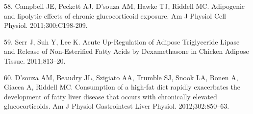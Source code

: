 \documentclass[11pt]{article} %
\begin{document}
58. Campbell JE, Peckett AJ, D'souza AM, Hawke TJ, Riddell MC.
Adipogenic and lipolytic effects of chronic glucocorticoid exposure. Am
J Physiol Cell Physiol. 2011;300:C198-209.

59. Serr J, Suh Y, Lee K. Acute Up-Regulation of Adipose Triglyceride
Lipase and Release of Non-Esterified Fatty Acids by Dexamethasone in
Chicken Adipose Tissue. 2011;813--20.

60. D'souza AM, Beaudry JL, Szigiato AA, Trumble SJ, Snook LA, Bonen A,
Giacca A, Riddell MC. Consumption of a high-fat diet rapidly exacerbates
the development of fatty liver disease that occurs with chronically
elevated glucocorticoids. Am J Physiol Gastrointest Liver Physiol.
2012;302:850--63.
\end{document}
